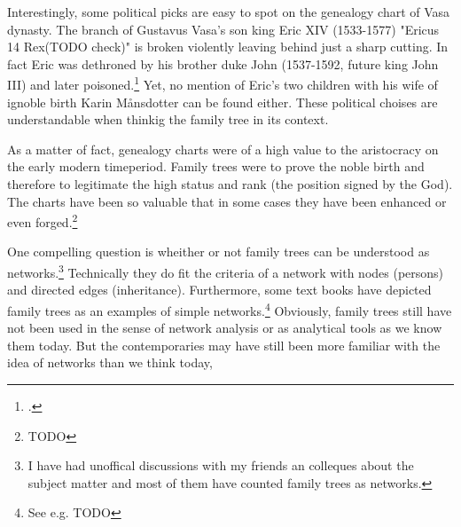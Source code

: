 Interestingly, some political picks are easy to spot on the genealogy chart of Vasa dynasty. The branch of Gustavus Vasa's son king Eric XIV (1533-1577) "Ericus 14 Rex(TODO check)" is broken violently leaving behind just a sharp cutting. In fact Eric was dethroned by his brother duke John (1537-1592, future king John III) and later poisoned.\footcite[p. 118-124.]{MelinEtAl} Yet, no mention of Eric's two children with his wife of ignoble birth Karin Månsdotter can be found either. These political choises are understandable when thinkig the family tree in its context. 

As a matter of fact, genealogy charts were of a high value to the aristocracy on the early modern timeperiod. Family trees were to prove the noble birth and therefore to legitimate the high status and rank (the position signed by the God). The charts have been so valuable that in some cases they have been enhanced or even forged.\footnote{TODO}

One compelling question is wheither or not family trees can be understood as networks.\footnote{I have had unoffical discussions with my friends an colleques about the subject matter and most of them have counted family trees as networks.} Technically they do fit the criteria of a network with nodes (persons) and directed edges (inheritance). Furthermore, some text books have depicted family trees as an examples of simple networks.\footnote{See e.g. TODO} Obviously, family trees still have not been used in the sense of network analysis or as analytical tools as we know them today. But the contemporaries may have still been more familiar with the idea of networks than we think today,